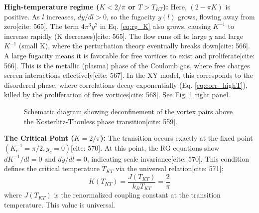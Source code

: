 \documentclass[11pt]{article}
\begin{document}
\textbf{High-temperature regime ($K < 2/\pi$ or $T > T_{KT}$):}
Here, $(2 - \pi K)$ is positive. As $l$ increases, $dy/dl > 0$, so the fugacity $y(l)$ grows, flowing away from zero[cite: 565]. The term $4 \pi^3 y^2$ in Eq. \eqref{eq:rg_K} also grows, causing $K^{-1}$ to increase rapidly (K decreases)[cite: 565]. The flow runs off to large $y$ and large $K^{-1}$ (small K), where the perturbation theory eventually breaks down[cite: 566]. A large fugacity means it is favorable for free vortices to exist and proliferate[cite: 566]. This is the metallic (plasma) phase of the Coulomb gas, where free charges screen interactions effectively[cite: 567]. In the XY model, this corresponds to the disordered phase, where correlations decay exponentially (Eq. \ref{eq:corr_highT}), killed by the proliferation of free vortices[cite: 568]. See Fig. \ref{fig:deconfinement} right panel.

\begin{figure}[h!]
    \centering
    \caption{Schematic diagram showing deconfinement of the vortex pairs above the Kosterlitz-Thouless phase transition[cite: 559].}
    \label{fig:deconfinement}
\end{figure}

\textbf{The Critical Point ($K = 2/\pi$):}
The transition occurs exactly at the fixed point $(K_c^{-1} = \pi/2, y_c = 0)$[cite: 570]. At this point, the RG equations show $dK^{-1}/dl = 0$ and $dy/dl = 0$, indicating scale invariance[cite: 570]. This condition defines the critical temperature $T_{KT}$ via the universal relation[cite: 571]:
\begin{equation}
K(T_{KT}) = \frac{J(T_{KT})}{k_B T_{KT}} = \frac{2}{\pi} \label{eq:TKT_condition}
\end{equation}
where $J(T_{KT})$ is the renormalized coupling constant at the transition temperature. This value is universal.
\end{document}
